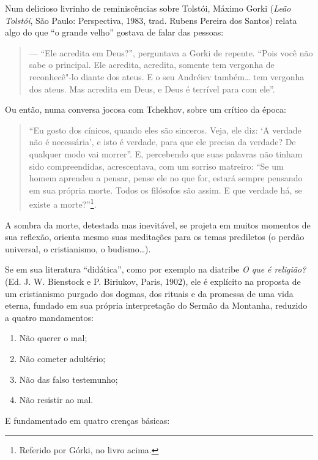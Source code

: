 Num delicioso livrinho de reminiscências sobre Tolstói,
Máximo Gorki (\emph{Leão Tolstói}, São Paulo:
Perspectiva, 1983, trad. Rubens Pereira dos Santos) relata algo do que ``o grande velho'' gostava de falar das
pessoas:

\begin{quote}
--- ``Ele acredita em Deus?'', perguntava a Gorki de repente.
``Pois você não sabe o principal. Ele acredita, acredita, somente tem
vergonha de reconhecê"-lo diante dos ateus. E o seu Andréiev também\ldots{} tem vergonha dos ateus. Mas acredita em Deus, e Deus é terrível para com
ele''.
\end{quote}

Ou então, numa conversa jocosa com Tchekhov, sobre um crítico da época:

\begin{quote}
``Eu gosto dos cínicos, quando eles são sinceros. Veja, ele diz: `A
verdade não é necessária', e isto é verdade, para que ele precisa da
verdade? De qualquer modo vai morrer''. E, percebendo que suas palavras
não tinham sido compreendidas, acrescentava, com um sorriso matreiro:
``Se um homem aprendeu a pensar, pense ele no que for, estará sempre
pensando em sua própria morte. Todos os filósofos são assim. E que
verdade há, se existe a morte?''\footnote{Referido por Górki, no livro
  acima.}.
\end{quote}

A sombra da morte, detestada mas inevitável, se projeta em muitos
momentos de sua reflexão, orienta mesmo suas meditações para os temas
prediletos (o perdão universal, o cristianismo, o budismo\ldots{}).

Se em sua literatura ``didática'', como por exemplo na diatribe \emph{O que é
religião?} (Ed. J. W. Bienstock e P. Biriukov, Paris, 1902), ele é
explícito na proposta de um cristianismo purgado dos dogmas, dos rituais
e da promessa de uma vida eterna, fundado em sua própria interpretação
do Sermão da Montanha, reduzido a quatro mandamentos:

\begin{enumerate}
\def\labelenumi{\arabic{enumi})}
\item
  Não querer o mal;
\item
  Não cometer adultério;
\item
  Não das falso testemunho;
\item
  Não resistir ao mal.
\end{enumerate}

\noindent
E fundamentado em quatro crenças básicas:

